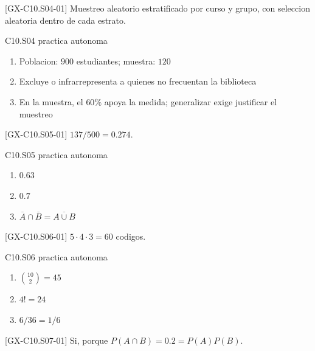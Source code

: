 \begin{shortanswer}{[GX-C10.S04-01]}
Muestreo aleatorio estratificado por curso y grupo, con seleccion aleatoria dentro de cada
estrato.
\end{shortanswer}

\begin{shortanswer}{C10.S04 practica autonoma}
\begin{enumerate}[label=\textbf{PX-C10.S04-\arabic*:}, leftmargin=*]
  \item Poblacion: \(900\) estudiantes; muestra: \(120\)
  \item Excluye o infrarrepresenta a quienes no frecuentan la biblioteca
  \item En la muestra, el \(60\%\) apoya la medida; generalizar exige justificar el muestreo
\end{enumerate}
\end{shortanswer}

\begin{shortanswer}{[GX-C10.S05-01]}
\(137/500=0.274\).
\end{shortanswer}

\begin{shortanswer}{C10.S05 practica autonoma}
\begin{enumerate}[label=\textbf{PX-C10.S05-\arabic*:}, leftmargin=*]
  \item \(0.63\)
  \item \(0.7\)
  \item \(\overline A\cap\overline B=\overline{A\cup B}\)
\end{enumerate}
\end{shortanswer}

\begin{shortanswer}{[GX-C10.S06-01]}
\(5\cdot4\cdot3=60\) codigos.
\end{shortanswer}

\begin{shortanswer}{C10.S06 practica autonoma}
\begin{enumerate}[label=\textbf{PX-C10.S06-\arabic*:}, leftmargin=*]
  \item \(\binom{10}{2}=45\)
  \item \(4!=24\)
  \item \(6/36=1/6\)
\end{enumerate}
\end{shortanswer}

\begin{shortanswer}{[GX-C10.S07-01]}
Si, porque \(P(A\cap B)=0.2=P(A)P(B)\).
\end{shortanswer}

